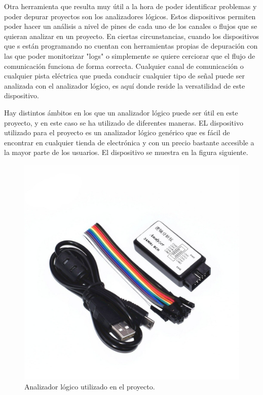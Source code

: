 Otra herramienta que resulta muy útil a la hora de poder identificar problemas y poder depurar proyectos son los analizadores lógicos. Estos dispositivos permiten poder hacer un análisis a nivel de pines de cada uno de los canales o flujos que se quieran analizar en un proyecto. En ciertas circunstancias, cuando los dispositivos que s están programando no cuentan con herramientas propias de depuración con las que poder monitorizar "logs" o simplemente se quiere cerciorar que el flujo de comunicación funciona de forma correcta. Cualquier canal de comunicación o cualquier pista eléctrica que pueda conducir cualquier tipo de señal puede ser analizada con el analizador lógico, es aquí donde reside la versatilidad de este dispositivo. 

Hay distintos ámbitos en los que un analizador lógico puede ser útil en este proyecto, y en este caso se ha utilizado de diferentes maneras. EL dispositivo utilizado para el proyecto es un analizador lógico genérico que es fácil de encontrar en cualquier tienda de electrónica y con un precio bastante accesible a la mayor parte de los usuarios. El dispositivo se muestra en la figura siguiente.

\begin{figure}[h]
    \centering
    \includegraphics[scale=1]{fig/logic_analyzer.jpg}
    \caption{Analizador lógico utilizado en el proyecto.}
    \label{fig:mesh1}
\end{figure}

